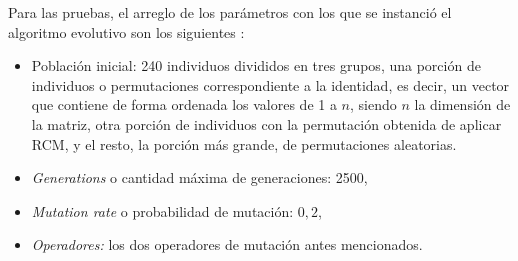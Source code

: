 Para las pruebas, el arreglo de los parámetros con los que se instanció el algoritmo evolutivo son los siguientes :
\begin{itemize}
    \item Población inicial: 240 individuos
    divididos en tres grupos, una porción de individuos o permutaciones correspondiente a la identidad, es decir, un vector que contiene de forma ordenada los valores de 1 a $n$, siendo $n$ la dimensión de la matriz, otra porción de individuos con la permutación obtenida de aplicar RCM, y el resto, la porción más grande, de permutaciones aleatorias.
    \item \textit{Generations} o cantidad máxima de generaciones: 2500,
    \item \textit{Mutation rate} o probabilidad de mutación: $0,2$,
    \item \textit{Operadores:} los dos operadores de mutación antes mencionados.
\end{itemize}

